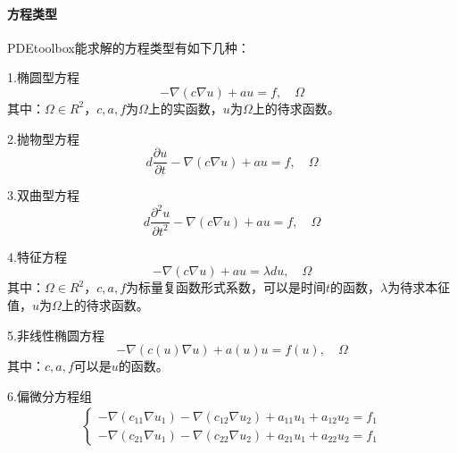         \paragraph{方程类型}PDEtoolbox能求解的方程类型有如下几种：
        \par
        1.椭圆型方程
        \[
            - \nabla (c\nabla u) + au = f, \quad \Omega
        \]
        其中：$\Omega \in R^2$，$c,a,f$为$\Omega$上的实函数，$u$为$\Omega$上的待求函数。
        \par
        2.抛物型方程
        \[
            d \frac{\partial u}{\partial t} - \nabla(c\nabla u)+au = f, \quad \Omega
        \]
        \par
        3.双曲型方程
        \[
            d \frac{\partial^2 u}{\partial t^2} - \nabla(c\nabla u)+au = f, \quad \Omega
        \]
        \par
        4.特征方程
        \[
            -\nabla (c\nabla u)+au = \lambda du, \quad \Omega
        \]
        其中：$\Omega \in R^2$，$c,a,f$为标量复函数形式系数，可以是时间$t$的函数，$\lambda$为待求本征值，$u$为$\Omega$上的待求函数。
        \par
        5.非线性椭圆方程
        \[
            -\nabla (c(u) \nabla u) + a(u)u = f(u), \quad \Omega
        \]
        其中：$c,a,f$可以是$u$的函数。
        \par
        6.偏微分方程组
        \begin{align*}
            \left\{
            \begin{aligned}
            -\nabla(c_{11}\nabla {u_1}) - \nabla(c_{12}\nabla {u_2}) + a_{11}u_1 +a_{12} u_2 = f_1\\
            -\nabla(c_{21}\nabla {u_1}) - \nabla(c_{22}\nabla {u_2}) + a_{21}u_1 +a_{22} u_2 = f_1
            \end{aligned}
            \right.
        \end{align*}
